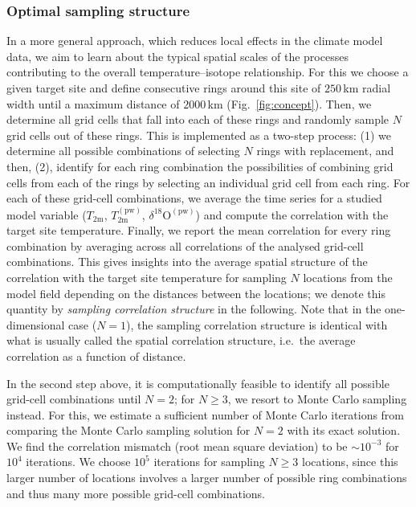 \documentclass[cp, manuscript]{copernicus}
\begin{document}

\subsubsection{Optimal sampling structure}\label{methods:opt.sampling}

In a more general approach, which reduces local effects in the climate model
data, we aim to learn about the typical spatial scales of the processes
contributing to the overall temperature--isotope relationship. For this we
choose a given target site and define consecutive rings around this site of
$250$\,km radial width until a maximum distance of $2000$\,km
(Fig.~\ref{fig:concept}). Then, we determine all grid cells that fall into each
of these rings and randomly sample $N$ grid cells out of these rings. This is
implemented as a two-step process: (1) we determine all possible combinations of
selecting $N$ rings with replacement, and then, (2), identify for each ring
combination the possibilities of combining grid cells from each of the rings by
selecting an individual grid cell from each ring. For each of these grid-cell
combinations, we average the time series for a studied model variable
($T_{2\mathrm{m}}$, $T_{2\mathrm{m}}^{\mathrm{(pw)}}$,
$\delta^{18}\mathrm{O}^{\mathrm{(pw)}}$) and compute the correlation with the
target site temperature. Finally, we report the mean correlation for every ring
combination by averaging across all correlations of the analysed grid-cell
combinations. This gives insights into the average spatial structure of the
correlation with the target site temperature for sampling $N$ locations from the
model field depending on the distances between the locations; we denote this
quantity by \emph{sampling correlation structure} in the following. Note that in
the one-dimensional case ($N=1$), the sampling correlation structure is
identical with what is usually called the spatial correlation structure, i.e.\
the average correlation as a function of distance.

In the second step above, it is computationally feasible to identify all
possible grid-cell combinations until $N=2$; for $N\geq3$, we resort to Monte
Carlo sampling instead. For this, we estimate a sufficient number of Monte Carlo
iterations from comparing the Monte Carlo sampling solution for $N=2$ with its
exact solution. We find the correlation mismatch (root mean square deviation) to
be $\sim10^{-3}$ for $10^4$ iterations. We choose $10^5$ iterations for sampling
$N\geq3$ locations, since this larger number of locations involves a larger
number of possible ring combinations and thus many more possible grid-cell
combinations.
\end{document}
